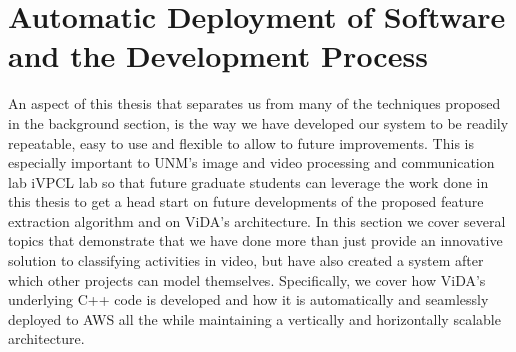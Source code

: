 \section{\label{section:auto_deployment}Automatic Deployment of Software and
the Development Process}
An aspect of this thesis that separates us from many of the techniques proposed
in the background section, is the way we have developed our system to be readily
repeatable, easy to use and flexible to allow to future improvements. This is
especially important to UNM's image and video processing and communication lab
iVPCL lab so that future graduate students can leverage the work done in this
thesis to get a head start on future developments of the proposed feature
extraction algorithm and on ViDA's architecture. In this section we cover
several topics that demonstrate that we have done more than just provide an
innovative solution to classifying activities in video, but have also created a
system after which other projects can model themselves. Specifically, we cover
how ViDA's underlying C++ code is developed and how it is automatically and
seamlessly deployed to AWS all the while maintaining a vertically and
horizontally scalable architecture.

